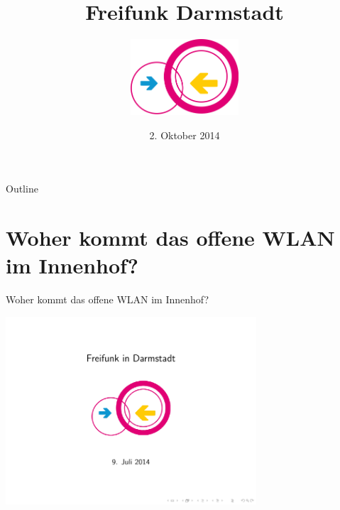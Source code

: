 \documentclass{beamer}
\title{Freifunk Darmstadt}
\author{\includegraphics[width=4cm]{images/logo}}
\date{2. Oktober 2014}
\begin{document}
\begin{frame}
\maketitle
\end{frame}


\begin{frame}{Outline}
\tableofcontents
\end{frame}

\section{Woher kommt das offene WLAN im Innenhof?}
\begin{frame}{Woher kommt das offene WLAN im Innenhof?}
\vfill
\pause
\begin{center}
\includegraphics[width=0.7\textwidth]{images/k6}
\end{center}
\vfill
\end{frame}
\end{document}
